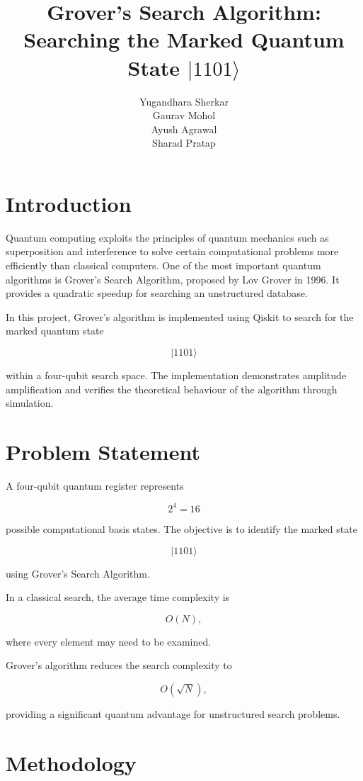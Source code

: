 \documentclass[12pt,a4paper]{article}
\title{\textbf{Grover's Search Algorithm:\\
Searching the Marked Quantum State $|1101\rangle$}}
\author{
Yugandhara Sherkar \\
Gaurav Mohol \\
Ayush Agrawal \\
Sharad Pratap
}
\date{}
\begin{document}
\maketitle

\section{Introduction}

Quantum computing exploits the principles of quantum mechanics such as superposition and interference to solve certain computational problems more efficiently than classical computers. One of the most important quantum algorithms is Grover's Search Algorithm, proposed by Lov Grover in 1996. It provides a quadratic speedup for searching an unstructured database.

In this project, Grover's algorithm is implemented using Qiskit to search for the marked quantum state

\[
|1101\rangle
\]

within a four-qubit search space. The implementation demonstrates amplitude amplification and verifies the theoretical behaviour of the algorithm through simulation.

\section{Problem Statement}

A four-qubit quantum register represents

\[
2^4 = 16
\]

possible computational basis states. The objective is to identify the marked state

\[
|1101\rangle
\]

using Grover's Search Algorithm.

In a classical search, the average time complexity is

\[
O(N),
\]

where every element may need to be examined.

Grover's algorithm reduces the search complexity to

\[
O(\sqrt{N}),
\]

providing a significant quantum advantage for unstructured search problems.

\section{Methodology}
\end{document}
